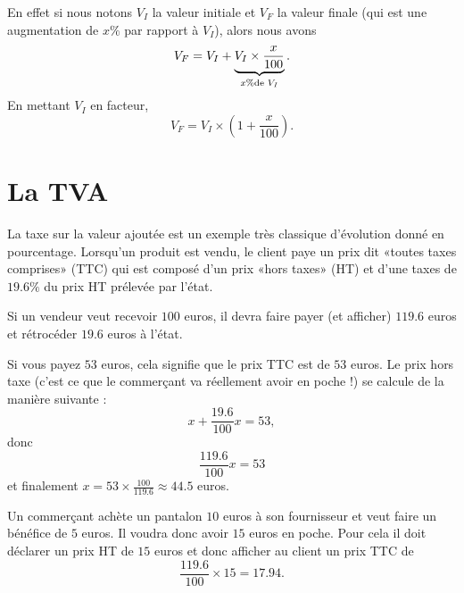 En effet si nous notons \( V_I\) la valeur initiale et \( V_F\) la valeur finale (qui est une augmentation de \( x\%\) par rapport à \( V_I\)), alors nous avons
\begin{equation}
    V_F=V_I+\underbrace{V_I\times \frac{ x }{ 100 }}_{x\% \text{de \( V_I\)}}.
\end{equation}
En mettant \( V_I\) en facteur,
\begin{equation}
    V_F=V_I\times \left( 1+\frac{ x }{ 100 } \right).
\end{equation}

\section{La TVA}

La taxe sur la valeur ajoutée est un exemple très classique d'évolution donné en pourcentage. Lorsqu'un produit est vendu, le client paye un prix dit «toutes taxes comprises» (TTC) qui est composé d'un prix «hors taxes» (HT) et d'une taxes de \( 19.6\%\) du prix HT prélevée par l'état.

\begin{example}
    Si un vendeur veut recevoir \( 100\) euros, il devra faire payer (et afficher) \( 119.6\) euros et rétrocéder \( 19.6\) euros à l'état.
\end{example}

\begin{example}
    Si vous payez \( 53\) euros, cela signifie que le prix TTC est de \( 53\) euros. Le prix hors taxe (c'est ce que le commerçant va réellement avoir en poche !) se calcule de la manière suivante :
    \begin{equation}
        x+\frac{ 19.6 }{ 100 }x=53,
    \end{equation}
    donc
    \begin{equation}
        \frac{ 119.6 }{ 100 }x=53
    \end{equation}
    et finalement \( x=53\times\frac{ 100 }{ 119.6 }\approx 44.5\) euros.
\end{example}

\begin{example}
    Un commerçant achète un pantalon \( 10\) euros à son fournisseur et veut faire un bénéfice de \( 5\) euros. Il voudra donc avoir \( 15\) euros en poche. Pour cela il doit déclarer un prix HT de \( 15\) euros et donc afficher au client un prix TTC de
    \begin{equation}
        \frac{ 119.6 }{ 100 }\times 15=17.94.
    \end{equation}
\end{example}

